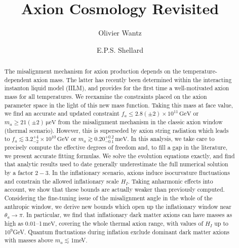 \documentclass[preprint,nofootinbib]{revtex4}
\newcommand{\units}[1]{\, \mathrm{#1}}
\begin{document}
\title{Axion Cosmology Revisited}

\author{Olivier Wantz}
\author{E.P.S. Shellard}




\begin{abstract}
The misalignment mechanism for axion production depends on the temperature-dependent axion mass. The latter has recently been determined within the interacting instanton liquid model (IILM), and provides for the first time a well-motivated axion mass for all temperatures. We reexamine the constraints placed on the axion parameter space in the light of this new mass function. Taking this mass at face value, we find an accurate and updated constraint $ f_a \le 2.8(\pm2)\times 10^{11}\units{GeV}$ or $m_a \ge 21(\pm2) \units{\mu eV}$ from the misalignment mechanism in the classic axion window (thermal scenario). However, this is superseded by axion string radiation which leads to $ f_a \lesssim 3.2^{+4}_{-2} \times 10^{10} \units{GeV}$ or $m_a \gtrsim 0.20 ^{+0.2}_{-0.1} \units{meV}$. In this analysis, we take care to precisely compute the effective degrees of freedom and, to fill a gap in the literature, we present accurate fitting formulas. We solve the evolution equations exactly, and find that analytic results used to date generally underestimate the full numerical solution by a factor $2-3$. In the inflationary scenario, axions induce isocurvature fluctuations and constrain the allowed inflationary scale $H_I$. Taking anharmonic effects into account, we show that these bounds are actually weaker than previously computed. Considering the fine-tuning issue of the misalignment angle in the whole of the anthropic window, we derive new bounds which open up the inflationary window near $\theta_a \to \pi$. In particular, we find that inflationary dark matter axions can have masses as high as 0.01--1$\units{meV}$, covering the whole thermal axion range, with values of $H_I$ up to $10^9$GeV. Quantum fluctuations during inflation exclude dominant dark matter axions with masses above $m_a\lesssim 1$meV.
\end{abstract}
\end{document}
